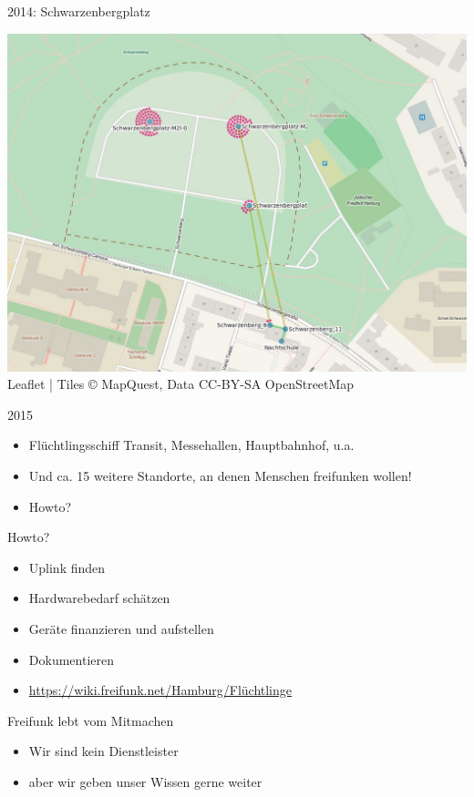 \documentclass[t]{beamer}
\begin{document}
  \begin{frame}{2014: Schwarzenbergplatz}
    \begin{center}
      \includegraphics[width=.7\textwidth]{Bilder/schwarzenberg-2015-09-22}
      \newline\tiny{Leaflet | Tiles © MapQuest, Data CC-BY-SA OpenStreetMap}
    \end{center}
  \end{frame}
  
  \begin{frame}{2015}
    \begin{itemize}
      \item Flüchtlingsschiff Transit, Messehallen, Hauptbahnhof, u.a.
      \item Und ca. 15 weitere Standorte, an denen Menschen freifunken wollen!
      \item Howto?
    \end{itemize}
  \end{frame}
  
  \begin{frame}{Howto?}
    \begin{itemize}
      \item Uplink finden
      \item Hardwarebedarf schätzen
      \item Geräte finanzieren und aufstellen
      \item Dokumentieren
      \bigskip
      \item \small{ \href{https://wiki.freifunk.net/Hamburg/Flüchtlinge}{https://wiki.freifunk.net/Hamburg/Flüchtlinge}}
    \end{itemize}
  \end{frame}
  
  \begin{frame}{Freifunk lebt vom Mitmachen}
    \begin{itemize}
      \item Wir sind kein Dienstleister
      \item aber wir geben unser Wissen gerne weiter
    \end{itemize}
  \end{frame}
  
\end{document}
